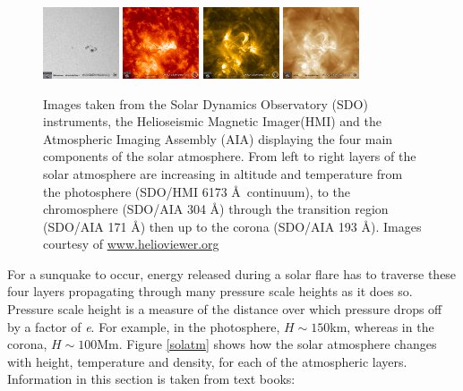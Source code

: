 \begin{figure}[H]%
  \begin{center}
  \includegraphics[width=0.20\textwidth]{2014_03_29_17_19_42_HMI_Int}%
  \includegraphics[width=0.20\textwidth]{2014_03_29_17_19_42_AIA_304}%
  \includegraphics[width=0.20\textwidth]{2014_03_29_17_19_42_AIA_171}%
  \includegraphics[width=0.20\textwidth]{2014_03_29_17_19_42_AIA_193}%
  \caption{ Images taken from the Solar Dynamics Observatory (SDO) instruments, the Helioseismic Magnetic Imager(HMI) and the Atmospheric Imaging Assembly (AIA) displaying the four main components of the solar atmosphere. From left to right layers of the solar atmosphere are increasing in altitude and temperature from the photosphere (SDO/HMI 6173 \AA\ continuum), to the chromosphere (SDO/AIA 304 \AA) through the transition region (SDO/AIA 171 \AA) then up to the corona (SDO/AIA 193 \AA). Images courtesy of \href{www.helioviewer.org}{www.helioviewer.org}}\label{solatmpics}
\end{center}
\end{figure}


For a sunquake to occur, energy released during a solar flare has to traverse these four layers propagating through many pressure scale heights as it does so. Pressure scale height is a measure of the distance over which pressure drops off by a factor of \emph{e}. For example, in the photosphere, $H\sim150$km, whereas in the corona, $H\sim100$Mm. Figure \ref{solatm} shows how the solar atmosphere changes with height, temperature and density, for each of the atmospheric layers. Information in this section is taken from text books: \cite{2003dysu.book.....D, 2004soas.book.....F}


